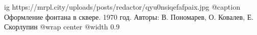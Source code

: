  
 
 
 
 

\ifcmt
  ig https://mrpl.city/uploads/posts/redactor/qyu0nsiqefafpaix.jpg
	@caption Оформление фонтана в сквере. 1970 год. Авторы: В. Пономарев, О. Ковалев, Е. Скорлупин
  @wrap center
  @width 0.9
\fi
